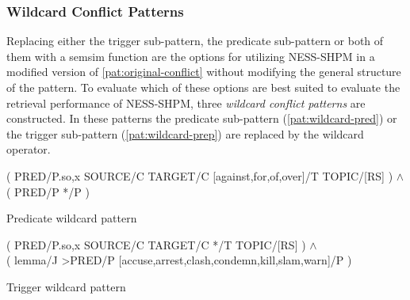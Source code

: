 \documentclass[11pt]{scrreprt}
\begin{document}







\subsubsection{Wildcard Conflict Patterns}
\label{sec:wildcard-conflict-patterns}
Replacing either the trigger sub-pattern, the predicate sub-pattern or both of them with a semsim function are the options for utilizing NESS-SHPM in a modified version of \cref{pat:original-conflict} without modifying the general structure of the pattern. To evaluate which of these options are best suited to evaluate the retrieval performance of NESS-SHPM, three \textit{wildcard conflict patterns} are constructed. In these patterns the predicate sub-pattern (\cref{pat:wildcard-pred}) or the trigger sub-pattern (\cref{pat:wildcard-prep}) are replaced by the wildcard operator. 

\begin{pattern}
  \normalfont\sffamily
  \centering
  ( PRED/P.{so,x} SOURCE/C TARGET/C [against,for,of,over]/T TOPIC/[RS] ) \(\wedge\) \\ ( PRED/P */P )
  \caption{Predicate wildcard pattern}
  \label{pat:wildcard-pred}
\end{pattern}

\begin{pattern}
  \normalfont\sffamily
  \centering
  ( PRED/P.{so,x} SOURCE/C TARGET/C */T TOPIC/[RS] ) \(\wedge\) \\  ( lemma/J >PRED/P [accuse,arrest,clash,condemn,kill,slam,warn]/P )
  \caption{Trigger wildcard pattern}
  \label{pat:wildcard-prep}
\end{pattern}
\end{document}
